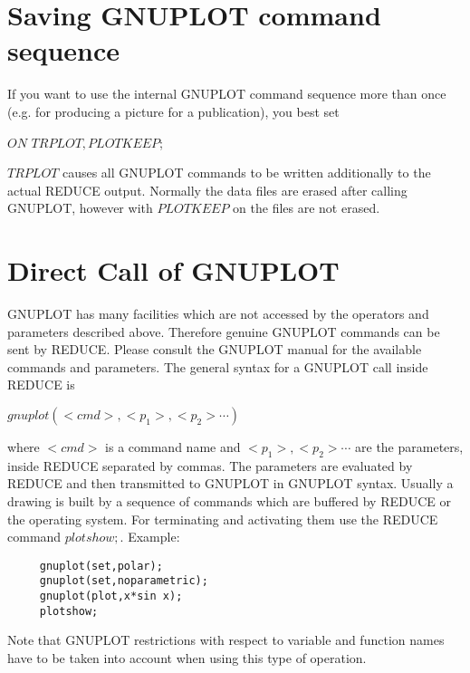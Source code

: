 \section{Saving GNUPLOT command sequence}

If you want to use the internal GNUPLOT command sequence
more than once (e.g. for producing a picture for a publication),
you best set 

$ON \,\, TRPLOT,PLOTKEEP$;

$TRPLOT$ causes all GNUPLOT commands
to be written additionally to the actual
{\small REDUCE} output. Normally the data files are
erased after calling GNUPLOT, however with $PLOTKEEP$ on
the files are not erased.

\section{Direct Call of GNUPLOT}

GNUPLOT has many facilities which are not accessed by
the operators and parameters described above. Therefore
genuine GNUPLOT commands can be sent by {\small REDUCE}.
Please consult the GNUPLOT manual for the available
commands and parameters. The general syntax for a GNUPLOT call
inside {\small REDUCE} is

    $gnuplot(<cmd>,<p_1>,<p_2> \cdots)$

where $<cmd>$ is a command name and $<p_1>,<p_2> \cdots$
are the parameters, inside {\small REDUCE} separated by
commas. The parameters are evaluated by
{\small REDUCE} and then transmitted to GNUPLOT in
GNUPLOT syntax. Usually a drawing is built by a
sequence of commands which are buffered 
by {\small REDUCE} or the operating
system. For terminating and activating them use the {\small REDUCE}
command $plotshow;$. Example:
\begin{verbatim}
     gnuplot(set,polar);
     gnuplot(set,noparametric);
     gnuplot(plot,x*sin x);
     plotshow;
\end{verbatim}
Note that GNUPLOT restrictions with respect to variable
and function names have to be taken into account when
using this type of operation.


